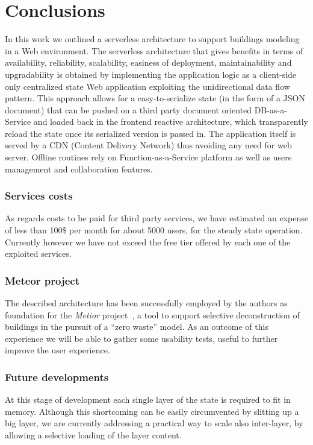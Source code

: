 \section{Conclusions}\label{sec:conclusions}

In this work we outlined a serverless architecture to support buildings modeling in a Web environment. The serverless  architecture that gives benefits in terms of availability, reliability, scalability, easiness of deployment, maintainability and upgradability is obtained by implementing the application logic as a client-side only centralized state Web application exploiting the unidirectional data flow pattern. This approach allows for a easy-to-serialize state (in the form of a JSON document) that can be pushed on a third party document oriented DB-as-a-Service and loaded back in the frontend reactive architecture, which transparently reload the state once its serialized version is passed in. The application itself is served by a CDN (Content Delivery Network) thus avoiding any need for web server. Offline routines rely on Function-as-a-Service platform as well as users management and collaboration features.

\subsubsection*{Services costs} As regards costs to be paid for third party services, we have estimated an expense of less than 100\$ per month for about 5000 users, for the steady state operation. Currently however we have not exceed the free tier offered by each one of the exploited services.

\subsubsection*{Meteor project} The described architecture has been successfully employed by the authors as foundation for the \emph{Metior} project~\cite{grapp17}, a tool to support selective deconstruction of buildings in the pursuit of a ``zero waste'' model.  As an outcome of this experience we will be able to gather some usability tests, useful to further improve the user experience.

\subsubsection*{Future developments} At this stage of development each single layer of the state is required to fit in memory. Although this shortcoming can be easily circumvented by slitting up a big layer, we are currently addressing a practical way to scale also inter-layer, by allowing a selective loading of the layer content.

